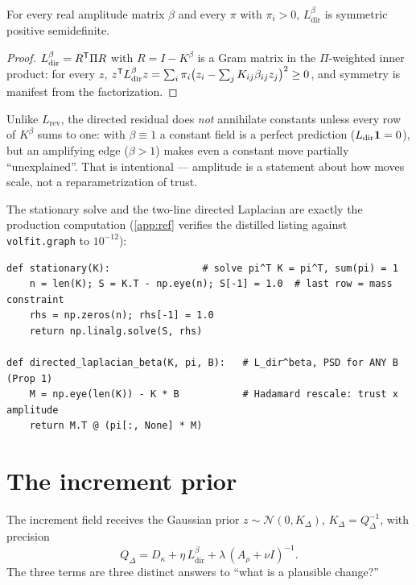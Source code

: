 \documentclass[11pt]{article}
\newcommand{\Kbeta}{K^{\beta}}
\newcommand{\Ldir}{L_{\mathrm{dir}}}
\newcommand{\Lrev}{L_{\mathrm{rev}}}
\newcommand{\Qdel}{Q_{\Delta}}
\newcommand{\Kdel}{K_{\Delta}}
\newcommand{\Arho}{A_{\rho}}
\begin{document}
\begin{proposition}
\label{prop:dir-psd}
For every real amplitude matrix $\beta$ and every $\pi$ with $\pi_i>0$,
$\Ldir^{\beta}$ is symmetric positive semidefinite.
\end{proposition}

\begin{proof}
$\Ldir^{\beta}=R\T\Pi R$ with $R=I-\Kbeta$ is a Gram matrix in the
$\Pi$-weighted inner product: for every $z$,
$z\T\Ldir^{\beta}z=\sum_i\pi_i\big(z_i-\sum_jK_{ij}\beta_{ij}z_j\big)^2\ge0$,
and symmetry is manifest from the factorization.
\end{proof}

\begin{remark}
Unlike $\Lrev$, the directed residual does \emph{not} annihilate constants
unless every row of $\Kbeta$ sums to one: with $\beta\equiv1$ a constant field
is a perfect prediction ($\Ldir\1=0$), but an amplifying edge
($\beta>1$) makes even a constant move partially ``unexplained''. That is
intentional --- amplitude is a statement about how moves scale, not a
reparametrization of trust.
\end{remark}

The stationary solve and the two-line directed Laplacian are exactly the
production computation (\cref{app:ref} verifies the distilled listing against
\texttt{volfit.graph} to $10^{-12}$):

\begin{lstlisting}[caption={The stationary distribution and the
$\beta$-weighted directed residual (distilled from
\texttt{graph/\{build,beta\}.py}).},label={lst:graph}]
def stationary(K):                # solve pi^T K = pi^T, sum(pi) = 1
    n = len(K); S = K.T - np.eye(n); S[-1] = 1.0  # last row = mass constraint
    rhs = np.zeros(n); rhs[-1] = 1.0
    return np.linalg.solve(S, rhs)

def directed_laplacian_beta(K, pi, B):   # L_dir^beta, PSD for ANY B (Prop 1)
    M = np.eye(len(K)) - K * B           # Hadamard rescale: trust x amplitude
    return M.T @ (pi[:, None] * M)
\end{lstlisting}

\section{The increment prior}
\label{sec:prior}

The increment field receives the Gaussian prior
$z\sim\mathcal N(0,\Kdel)$, $\Kdel=\Qdel^{-1}$, with precision
\begin{equation}
\boxed{\;\Qdel=D_\kappa+\eta\,\Ldir^{\beta}+\lambda\,(\Arho+\nu I)^{-1}.\;}
\label{eq:Qdelta}
\end{equation}
The three terms are three distinct answers to ``what is a plausible change?''
\end{document}
